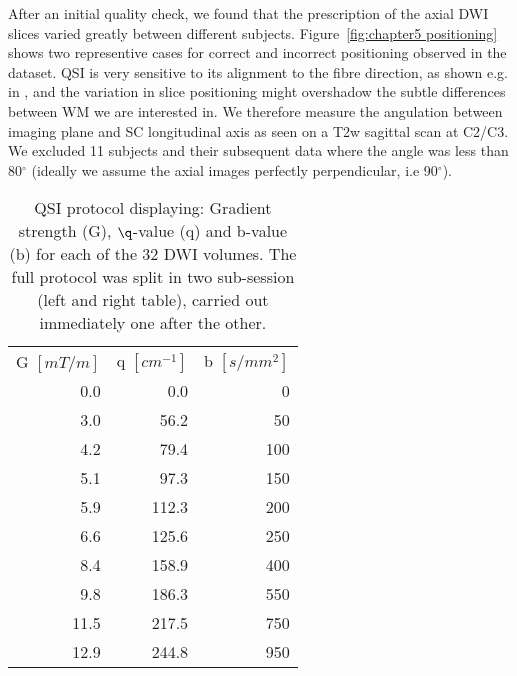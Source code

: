 After an initial quality check, we found that the prescription of the axial \gls{DWI} slices varied greatly between different subjects. Figure~\ref{fig:chapter5 positioning} shows two representive cases for correct and incorrect positioning observed in the dataset. \gls{QSI} is very sensitive to its alignment to the fibre direction, as shown e.g. in \citep{Avram:2004}, and the variation in slice positioning might overshadow the subtle differences between \gls{WM} we are interested in. We therefore measure the angulation between imaging plane and \gls{SC} longitudinal axis as seen on a T2w sagittal scan at C2/C3. We excluded 11 subjects and their subsequent data where the angle was less than 80$^\circ$ (ideally we assume the axial images perfectly perpendicular, i.e 90$^\circ$).

\begin{table}[p]
\begin{captionframe}
   \caption[QSI protocol displaying: Gradient strength (G), $\q$-value (q) and b-value (b) for each of the 32 DWI volumes.]{QSI protocol displaying: Gradient strength (G), $\q$-value (q) and b-value (b) for each of the 32 DWI volumes. The full protocol was split in two sub-session (left and right table), carried out immediately one after the other.}
   \label{tab:chap5exp1 protocol}
\end{captionframe}
\begin{tableframe}
	 \centering     
		 \begin{adjustbox}{width={0.47\textwidth},keepaspectratio}
        \begin{tabular}{rrr}
        \addlinespace
            \multicolumn{3}{l}{}\\
        \toprule
            G $[mT/m]$ & q $[cm^{-1}]$ & b $[s/mm^2]$ \\
            \cmidrule(r){1-1}\cmidrule(lr){2-2}\cmidrule(l){3-3}
            0.0   & 0.0   & 0 \\
            3.0   & 56.2  & 50 \\
            4.2   & 79.4  & 100 \\
            5.1   & 97.3  & 150 \\
            5.9   & 112.3 & 200 \\
            6.6   & 125.6 & 250 \\
            8.4   & 158.9 & 400 \\
            9.8   & 186.3 & 550 \\
            11.5  & 217.5 & 750 \\
            12.9  & 244.8 & 950 \\

\end{tabular}
\end{adjustbox}
\end{tableframe}
\end{table}
